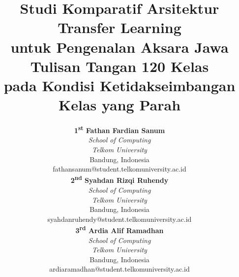 \documentclass[conference]{IEEEtran}
\begin{document}
\title{Studi Komparatif Arsitektur Transfer Learning\\
untuk Pengenalan Aksara Jawa Tulisan Tangan 120 Kelas\\
pada Kondisi Ketidakseimbangan Kelas yang Parah}

\author{%
\parbox{\linewidth}{\centering
  \begin{minipage}[t]{.31\linewidth}\centering
    \normalsize\textbf{1\textsuperscript{st} Fathan Fardian Sanum}\\[4pt]
    \normalsize\textit{School of Computing}\\
    \textit{Telkom University}\\
    Bandung, Indonesia\\
    \small fathansanum@student.\linebreak telkomuniversity.ac.id
  \end{minipage}%
  \hfill%
  \begin{minipage}[t]{.31\linewidth}\centering
    \normalsize\textbf{2\textsuperscript{nd} Syahdan Rizqi Ruhendy}\\[4pt]
    \normalsize\textit{School of Computing}\\
    \textit{Telkom University}\\
    Bandung, Indonesia\\
    \small syahdanruhendy@student.\linebreak telkomuniversity.ac.id
  \end{minipage}%
  \hfill%
  \begin{minipage}[t]{.31\linewidth}\centering
    \normalsize\textbf{3\textsuperscript{rd} Ardia Alif Ramadhan}\\[4pt]
    \normalsize\textit{School of Computing}\\
    \textit{Telkom University}\\
    Bandung, Indonesia\\
    \small ardiaramadhan@student.\linebreak telkomuniversity.ac.id
  \end{minipage}%
}%
}

\maketitle
\end{document}
